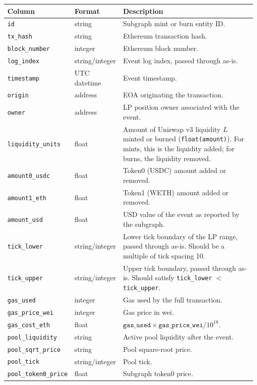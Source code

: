 \documentclass[11pt,a4paper]{article}
\begin{document}
\begin{xltabular}{\linewidth}{L{4.5cm}L{3.0cm}Y}
\toprule
\textbf{Column} & \textbf{Format} & \textbf{Description} \\
\midrule
\texttt{id} & string & Subgraph mint or burn entity ID. \\
\texttt{tx\_hash} & string & Ethereum transaction hash. \\
\texttt{block\_number} & integer & Ethereum block number. \\
\texttt{log\_index} & string/integer & Event log index, passed through
  as-is. \\
\texttt{timestamp} & UTC datetime & Event timestamp. \\
\texttt{origin} & address & EOA originating the transaction. \\
\texttt{owner} & address & LP position owner associated with the event. \\
\texttt{liquidity\_units} & float & Amount of Uniswap v3 liquidity
  $L$ minted or burned (\texttt{float(amount)}). For mints, this is the
  liquidity added; for burns, the liquidity removed. \\
\texttt{amount0\_usdc} & float & Token0 (USDC) amount added or removed. \\
\texttt{amount1\_eth} & float & Token1 (WETH) amount added or removed. \\
\texttt{amount\_usd} & float & USD value of the event as reported by the
  subgraph. \\
\texttt{tick\_lower} & string/integer & Lower tick boundary of the LP
  range, passed through as-is. Should be a multiple of tick spacing 10. \\
\texttt{tick\_upper} & string/integer & Upper tick boundary, passed through
  as-is. Should satisfy \texttt{tick\_lower} $<$ \texttt{tick\_upper}. \\
\texttt{gas\_used} & integer & Gas used by the full transaction. \\
\texttt{gas\_price\_wei} & integer & Gas price in wei. \\
\texttt{gas\_cost\_eth} & float & $\texttt{gas\_used} \times
  \texttt{gas\_price\_wei} / 10^{18}$. \\
\texttt{pool\_liquidity} & string & Active pool liquidity after the event. \\
\texttt{pool\_sqrt\_price} & string & Pool square-root price. \\
\texttt{pool\_tick} & string/integer & Pool tick. \\
\texttt{pool\_token0\_price} & float & Subgraph token0 price. \\

\end{xltabular}
\end{document}
